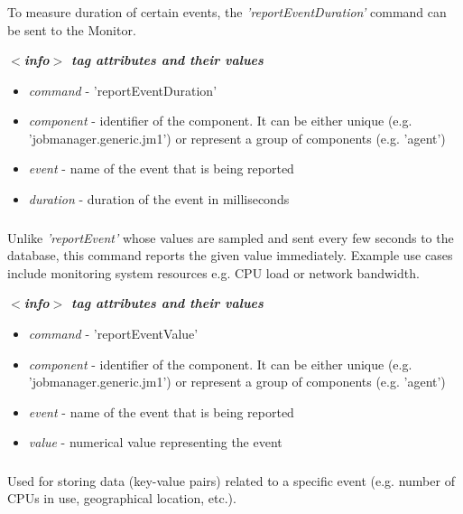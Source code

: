 \subsubsection{}
\label{sct:reporteventduration}
To measure duration of certain events, the \emph{'reportEventDuration'} command can be sent to the Monitor.

\emph{\bf $<$info$>$ tag attributes and their values}
\begin{itemize}
  \item \emph{command} - 'reportEventDuration'
  \item \emph{component} - identifier of the component. It can be either unique (e.g. 'jobmanager.generic.jm1') or represent a group of components (e.g. 'agent')
  \item \emph{event} - name of the event that is being reported
  \item \emph{duration} - duration of the event in milliseconds
\end{itemize}


\subsubsection{}
\label{sct:reporteventvalue}
Unlike \emph{'reportEvent'} whose values are sampled and sent every few seconds to the database, this command reports the given value immediately. Example use cases include monitoring system resources e.g. CPU load or network bandwidth.

\emph{\bf $<$info$>$ tag attributes and their values}
\begin{itemize}
  \item \emph{command} - 'reportEventValue'
  \item \emph{component} - identifier of the component. It can be either unique (e.g. 'jobmanager.generic.jm1') or represent a group of components (e.g. 'agent')
  \item \emph{event} - name of the event that is being reported
  \item \emph{value} - numerical value representing the event
\end{itemize}


\subsubsection{}
\label{sct:storeeventdetails}
Used for storing data (key-value pairs) related to a specific event (e.g. number of CPUs in use, geographical location, etc.).

